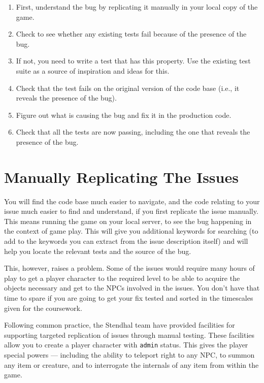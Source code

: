 \documentclass[
]{book}
\providecommand{\tightlist}{%
  \setlength{\itemsep}{0pt}\setlength{\parskip}{0pt}}
\begin{document}
\begin{enumerate}
\def\labelenumi{\arabic{enumi}.}
\tightlist
\item
  First, understand the bug by replicating it manually in your local copy of the game.
\item
  Check to see whether any existing tests fail because of the presence of the bug.
\item
  If not, you need to write a test that has this property. Use the existing test suite as a source of inspiration and ideas for this.
\item
  Check that the test fails on the original version of the code base (i.e., it reveals the presence of the bug).
\item
  Figure out what is causing the bug and fix it in the production code.
\item
  Check that all the tests are now passing, including the one that reveals the presence of the bug.
\end{enumerate}

\hypertarget{replicatingissues}{%
\section{Manually Replicating The Issues}\label{replicatingissues}}

You will find the code base much easier to navigate, and the code relating to your issue much easier to find and understand, if you first replicate the issue manually. This means running the game on your local server, to see the bug happening in the context of game play. This will give you additional keywords for searching (to add to the keywords you can extract from the issue description itself) and will help you locate the relevant tests and the source of the bug.

This, however, raises a problem. Some of the issues would require many hours of play to get a player character to the required level to be able to acquire the objects necessary and get to the NPCs involved in the issues. You don't have that time to spare if you are going to get your fix tested and sorted in the timescales given for the coursework.

Following common practice, the Stendhal team have provided facilities for supporting targeted replication of issues through manual testing. These facilities allow you to create a player character with \texttt{admin} status. This gives the player special powers --- including the ability to teleport right to any NPC, to summon any item or creature, and to interrogate the internals of any item from within the game.
\end{document}

